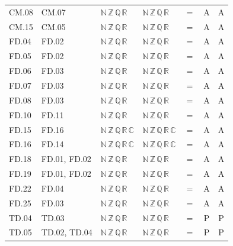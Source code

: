 {\begin{longtable}{l l l l c c c}
CM.08 & CM.07 & $\mathbb N\,\mathbb Z\,\mathbb Q\,\mathbb R$ & $\mathbb N\,\mathbb Z\,\mathbb Q\,\mathbb R$ & $=$ & A & A \\
CM.15 & CM.05 & $\mathbb N\,\mathbb Z\,\mathbb Q\,\mathbb R$ & $\mathbb N\,\mathbb Z\,\mathbb Q\,\mathbb R$ & $=$ & A & A \\
FD.04 & FD.02 & $\mathbb N\,\mathbb Z\,\mathbb Q\,\mathbb R$ & $\mathbb N\,\mathbb Z\,\mathbb Q\,\mathbb R$ & $=$ & A & A \\
FD.05 & FD.02 & $\mathbb N\,\mathbb Z\,\mathbb Q\,\mathbb R$ & $\mathbb N\,\mathbb Z\,\mathbb Q\,\mathbb R$ & $=$ & A & A \\
FD.06 & FD.03 & $\mathbb N\,\mathbb Z\,\mathbb Q\,\mathbb R$ & $\mathbb N\,\mathbb Z\,\mathbb Q\,\mathbb R$ & $=$ & A & A \\
FD.07 & FD.03 & $\mathbb N\,\mathbb Z\,\mathbb Q\,\mathbb R$ & $\mathbb N\,\mathbb Z\,\mathbb Q\,\mathbb R$ & $=$ & A & A \\
FD.08 & FD.03 & $\mathbb N\,\mathbb Z\,\mathbb Q\,\mathbb R$ & $\mathbb N\,\mathbb Z\,\mathbb Q\,\mathbb R$ & $=$ & A & A \\
FD.10 & FD.11 & $\mathbb N\,\mathbb Z\,\mathbb Q\,\mathbb R$ & $\mathbb N\,\mathbb Z\,\mathbb Q\,\mathbb R$ & $=$ & A & A \\
FD.15 & FD.16 & $\mathbb N\,\mathbb Z\,\mathbb Q\,\mathbb R\,\mathbb C$ & $\mathbb N\,\mathbb Z\,\mathbb Q\,\mathbb R\,\mathbb C$ & $=$ & A & A \\
FD.16 & FD.14 & $\mathbb N\,\mathbb Z\,\mathbb Q\,\mathbb R\,\mathbb C$ & $\mathbb N\,\mathbb Z\,\mathbb Q\,\mathbb R\,\mathbb C$ & $=$ & A & A \\
FD.18 & FD.01, FD.02 & $\mathbb N\,\mathbb Z\,\mathbb Q\,\mathbb R$ & $\mathbb N\,\mathbb Z\,\mathbb Q\,\mathbb R$ & $=$ & A & A \\
FD.19 & FD.01, FD.02 & $\mathbb N\,\mathbb Z\,\mathbb Q\,\mathbb R$ & $\mathbb N\,\mathbb Z\,\mathbb Q\,\mathbb R$ & $=$ & A & A \\
FD.22 & FD.04 & $\mathbb N\,\mathbb Z\,\mathbb Q\,\mathbb R$ & $\mathbb N\,\mathbb Z\,\mathbb Q\,\mathbb R$ & $=$ & A & A \\
FD.25 & FD.03 & $\mathbb N\,\mathbb Z\,\mathbb Q\,\mathbb R$ & $\mathbb N\,\mathbb Z\,\mathbb Q\,\mathbb R$ & $=$ & A & A \\
TD.04 & TD.03 & $\mathbb N\,\mathbb Z\,\mathbb Q\,\mathbb R$ & $\mathbb N\,\mathbb Z\,\mathbb Q\,\mathbb R$ & $=$ & P & P \\
TD.05 & TD.02, TD.04 & $\mathbb N\,\mathbb Z\,\mathbb Q\,\mathbb R$ & $\mathbb N\,\mathbb Z\,\mathbb Q\,\mathbb R$ & $=$ & P & P \\

\end{longtable}}
